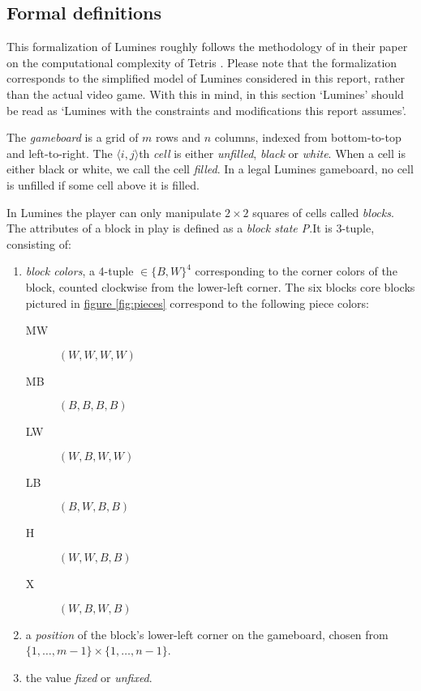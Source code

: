 \subsection{Formal definitions}
\label{sub:formal}

This formalization of Lumines roughly follows the methodology of \citeauthor{tetris} in their paper on the computational complexity of Tetris \cite{tetris}. Please note that the formalization corresponds to the simplified model of Lumines considered in this report, rather than the actual video game. With this in mind, in this section `Lumines' should be read as `Lumines with the constraints and modifications this report assumes'.

\begin{description}[style=unboxed, leftmargin=0cm,labelsep=1em]
    \item[The gameboard] The \emph{gameboard} is a grid of $m$ rows and $n$ columns, indexed from bottom-to-top and left-to-right. The $\langle i,j \rangle$th \emph{cell} is either \emph{unfilled}, \emph{black} or \emph{white}. When a cell is either black or white, we call the cell \emph{filled}. In a legal Lumines gameboard, no cell is unfilled if some cell above it is filled.

    \item[Game blocks] In Lumines the player can only manipulate $2 \times 2$ squares of cells called \textit{blocks}. The attributes of a block in play is defined as a \emph{block state P}.It is 3-tuple, consisting of: 
    \begin{enumerate}
        \item \emph{block colors}, a 4-tuple $\in \{B,W\}^4$ corresponding to the corner colors of the block, counted clockwise from the lower-left corner. The six blocks core blocks pictured in \hyperref[fig:pieces]{figure \ref*{fig:pieces}} correspond to the following piece colors:

        \begin{description}
            \item[MW] $(W,W,W,W)$
            \item[MB] $(B,B,B,B)$
            \item[LW] $(W,B,W,W)$
            \item[LB] $(B,W,B,B)$
            \item[H] $(W,W,B,B)$
            \item[X] $(W,B,W,B)$
        \end{description}

        \item a \emph{position} of the block's lower-left corner on the gameboard, chosen from $\{1, \ldots, m-1\} \times \{1, \ldots, n-1\}$.
        \item the value \emph{fixed} or \emph{unfixed}.
    \end{enumerate}


\end{description}
